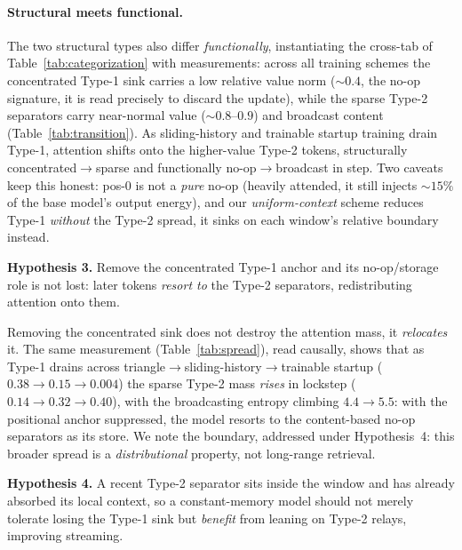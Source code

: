 \documentclass[letterpaper]{article} %
\begin{document}
\paragraph{Structural meets functional.} The two structural types also differ \emph{functionally}, instantiating the cross-tab of Table~\ref{tab:categorization} \citep{fesser2026unifying} with measurements: across all training schemes the concentrated Type-1 sink carries a low relative value norm ($\sim$$0.4$, the no-op signature, it is read precisely to discard the update), while the sparse Type-2 separators carry near-normal value ($\sim$$0.8$--$0.9$) and broadcast content (Table~\ref{tab:transition}). As sliding-history and trainable startup training drain Type-1, attention shifts onto the higher-value Type-2 tokens, structurally concentrated$\to$sparse and functionally no-op$\to$broadcast in step. Two caveats keep this honest: pos-0 is not a \emph{pure} no-op (heavily attended, it still injects $\sim$$15\%$ of the base model's output energy), and our \emph{uniform-context} scheme reduces Type-1 \emph{without} the Type-2 spread, it sinks on each window's relative boundary instead.



\begin{hypbox}
\textbf{Hypothesis 3.} Remove the concentrated Type-1 anchor and its no-op/storage role is not lost: later tokens \emph{resort to} the Type-2 separators, redistributing attention onto them.
\end{hypbox}

Removing the concentrated sink does not destroy the attention mass, it \emph{relocates} it. The same measurement (Table~\ref{tab:spread}), read causally, shows that as Type-1 drains across triangle$\to$sliding-history$\to$trainable startup ($0.38\!\to\!0.15\!\to\!0.004$) the sparse Type-2 mass \emph{rises} in lockstep ($0.14\!\to\!0.32\!\to\!0.40$), with the broadcasting entropy climbing $4.4\!\to\!5.5$: with the positional anchor suppressed, the model resorts to the content-based no-op separators as its store. We note the boundary, addressed under Hypothesis~4: this broader spread is a \emph{distributional} property, not long-range retrieval.

\begin{hypbox}
\textbf{Hypothesis 4.} A recent Type-2 separator sits inside the window and has already absorbed its local context, so a constant-memory model should not merely tolerate losing the Type-1 sink but \emph{benefit} from leaning on Type-2 relays, improving streaming.
\end{hypbox}
\end{document}
